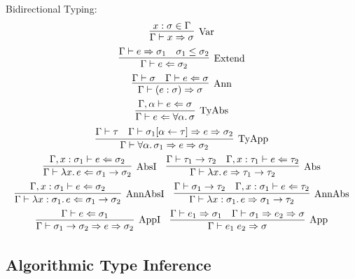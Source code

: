 Bidirectional Typing:
\begin{gather*}
  \infer[\text{Var}]{
    \Gamma \vdash x \Rightarrow \sigma
  }{
    x: \sigma \in \Gamma
  }
  \\
  \infer[\text{Extend}]{
    \Gamma \vdash e \Leftarrow \sigma_2
  }{
    \Gamma \vdash e \Rightarrow \sigma_1
    &
    \sigma_1 \leq \sigma_2
  }
  \\
  \infer[\text{Ann}]{
    \Gamma \vdash (e: \sigma) \Rightarrow \sigma
  }{
    \Gamma \vdash \sigma
    &
    \Gamma \vdash e \Leftarrow \sigma
  }
  \\
  \infer[\text{TyAbs}]{
    \Gamma \vdash e \Leftarrow \forall \alpha\ldotp \sigma
  }{
    \Gamma, \alpha \vdash e \Leftarrow \sigma
  }
  \\
  \infer[\text{TyApp}]{
    \Gamma \vdash \forall \alpha\ldotp \sigma_1 \Rightarrow e \Rightarrow \sigma_2
  }{
    \Gamma \vdash \tau
    &
    \Gamma \vdash \sigma_1[\alpha \assign \tau] \Rightarrow e \Rightarrow \sigma_2
  }
  \\
  \infer[\text{AbsI}]{
    \Gamma \vdash \lambda x\ldotp e \Leftarrow \sigma_1 \to \sigma_2
  }{
    \Gamma, x: \sigma_1 \vdash e \Leftarrow \sigma_2
  }
  \hspace{1em}
  \infer[\text{Abs}]{
    \Gamma \vdash \lambda x\ldotp e \Rightarrow \tau_1 \to \tau_2
  }{
    \Gamma \vdash \tau_1 \to \tau_2
    &
    \Gamma, x: \tau_1 \vdash e \Leftarrow \tau_2
  }
  \\
  \infer[\text{AnnAbsI}]{
    \Gamma \vdash \lambda x: \sigma_1\ldotp e \Leftarrow \sigma_1 \to \sigma_2
  }{
    \Gamma, x: \sigma_1 \vdash e \Leftarrow \sigma_2
  }
  \hspace{1em}
  \infer[\text{AnnAbs}]{
    \Gamma \vdash \lambda x: \sigma_1\ldotp e \Rightarrow \sigma_1 \to \tau_2
  }{
    \Gamma \vdash \sigma_1 \to \tau_2
    &
    \Gamma, x: \sigma_1 \vdash e \Leftarrow \tau_2
  }
  \\
  \infer[\text{AppI}]{
    \Gamma \vdash \sigma_1 \to \sigma_2 \Rightarrow e \Rightarrow \sigma_2
  }{
    \Gamma \vdash e \Leftarrow \sigma_1
  }
  \hspace{1em}
  \infer[\text{App}]{
    \Gamma \vdash e_1\; e_2 \Rightarrow \sigma
  }{
    \Gamma \vdash e_1 \Rightarrow \sigma_1
    &
    \Gamma \vdash \sigma_1 \Rightarrow e_2 \Rightarrow \sigma
  }
\end{gather*}

\subsection{Algorithmic Type Inference}

